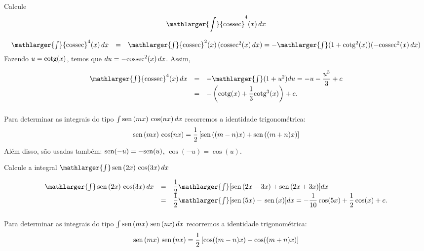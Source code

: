 \cleardoublepage\documentclass[../main.tex]{subfiles}
\begin{document}
\begin{ex}
Calcule 
\[ \mathlarger{\int} {\rm cossec}^4 (x) \, dx\]

\begin{solution}
\[ \begin{array}{rcl} \mathlarger{\int} {\rm cossec}^4 (x) \, dx&=& \mathlarger{\int} {\rm cossec}^2(x) \,({\rm cossec}^2(x)\, dx) = -\mathlarger{\int} (1+ {\rm cotg}^2 (x)) (-{\rm cossec}^2(x)\, dx) \end{array} \]
Fazendo \( u={\rm cotg}(x)\), temos que \( du=-{\rm cossec}^2(x)\,dx \). Assim,

\[ \begin{array}{rcl} \mathlarger{\int} {\rm cossec}^4 (x) \, dx&=& -\mathlarger{\int} (1+ u^2 ) du= -u- \dfrac{u^3}{3}+c \\ &=&-\left( {\rm cotg}(x)+\dfrac{1}{3} {\rm cotg}^3 (x) \right) +c. \end{array}\]

\end{solution}
\end{ex}

\subsubsection[\formula{Integrais do tipo $\int \sen(mx)\,\cos(nx)\,dx$}]{}
Para determinar as integrais do tipo $\int \sen(mx)\,\cos(nx)\,dx$ recorremos a identidade trigonométrica:
\begin{equation}
    \operatorname{sen}\,(mx)\,\cos(nx)=\dfrac{1}{2}\left[\operatorname{sen}\,((m-n)x) +\operatorname{sen}\,((m+n)x)\right]
\end{equation}
Além disso, são usadas também: \({\rm sen}(-u)=-{\rm sen}(u)\), \(\cos(-u)=\cos(u)\).
\begin{ex}
Calcule a integral \(\mathlarger{\int} \sen(2x)\,\cos(3x)\,dx\)

\begin{solution}
\[ \begin{array}{rcl} \mathlarger{\int} \sen(2x)\,\cos(3x)\,dx &=& \dfrac{1}{2} \mathlarger{\int} [\sen(2x-3x)+\sen(2x+3x)]dx\\ &=& \dfrac{1}{2} \mathlarger{\int} [\sen(5x)-\,\sen(x)]dx = -\dfrac{1}{10}\cos (5x)+\dfrac{1}{2}\cos(x) +c. \end{array} \]
\end{solution}
\end{ex}

\subsubsection[\formula{Integrais do tipo $\int  \sen(mx)\,\sen(nx)\,dx$}]{}
Para determinar as integrais do tipo $\int  \sen(mx)\,\sen(nx)\,dx$ recorremos a identidade trigonométrica:
\begin{equation}
    \operatorname{sen}\, (mx)\,\operatorname{sen}\,(nx)= \dfrac{1}{2}\left[ \cos((m-n)x) -\cos((m+n)x)\right]
\end{equation}
\end{document}
